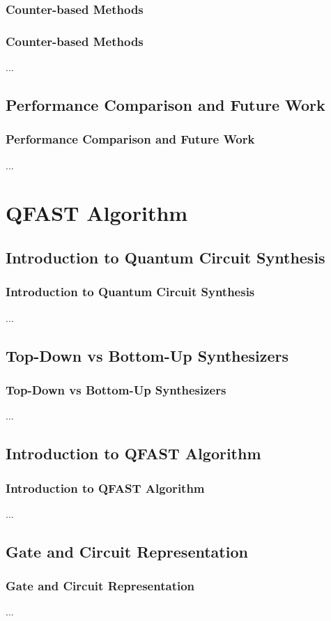 \documentclass[aspectratio=1610]{beamer}
\begin{document}
\subsubsection{Counter-based Methods}
\begin{frame}
\frametitle{Counter-based Methods}
...
\end{frame}

\subsection{Performance Comparison and Future Work}
\begin{frame}
\frametitle{Performance Comparison and Future Work}
...
\end{frame}

\section{QFAST Algorithm}
\subsection{Introduction to Quantum Circuit Synthesis}
\begin{frame}
\frametitle{Introduction to Quantum Circuit Synthesis}
...
\end{frame}

\subsection{Top-Down vs Bottom-Up Synthesizers}
\begin{frame}
\frametitle{Top-Down vs Bottom-Up Synthesizers}
...
\end{frame}

\subsection{Introduction to QFAST Algorithm}
\begin{frame}
\frametitle{Introduction to QFAST Algorithm}
...
\end{frame}

\subsection{Gate and Circuit Representation}
\begin{frame}
\frametitle{Gate and Circuit Representation}
...
\end{frame}
\end{document}
